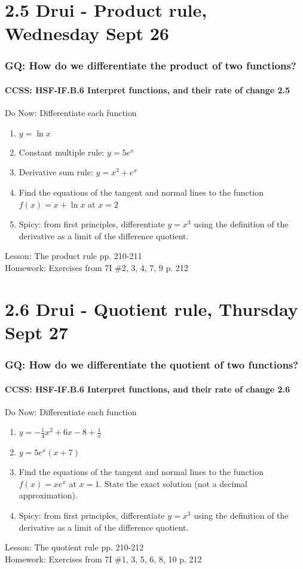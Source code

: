 \documentclass{beamer}
\begin{document}
\section{2.5 Drui - Product rule, Wednesday Sept 26}
  \frame
  {
    \frametitle{GQ: How do we differentiate the product of two functions?}
    \framesubtitle{CCSS: HSF-IF.B.6 Interpret functions, and their rate of change  \alert{2.5}}

    \begin{block}{Do Now: Differentiate each function}
      \begin{enumerate}
      \item $y= \ln x$
      \item Constant multiple rule: $y=5e^x$
      \item Derivative sum rule: $y=x^3+e^x$
      \item Find the equations of the tangent and normal lines to the function $f(x)=x+ \ln x$ at $x=2$
      \item Spicy: from first principles, differentiate $y=x^3$ using the definition of the derivative as a limit of the difference quotient.
      \end{enumerate}
   \end{block}
    Lesson: The product rule pp. 210-211\\ \bigskip
    Homework: Exercises from 7I \#2, 3, 4, 7, 9 p. 212
  }

\section{2.6 Drui - Quotient rule, Thursday Sept 27}
  \frame
  {
    \frametitle{GQ: How do we differentiate the quotient of two functions?}
    \framesubtitle{CCSS: HSF-IF.B.6 Interpret functions, and their rate of change  \alert{2.6}}

    \begin{block}{Do Now: Differentiate each function}
      \begin{enumerate}
      \item $y= -\frac{1}{4}x^2+6x-8+\frac{1}{x}$
      \item $y=5e^x(x+7)$
      \item Find the equations of the tangent and normal lines to the function $f(x)=x e^x$ at $x=1$. State the exact solution (not a decimal approximation).
      \item Spicy: from first principles, differentiate $y=x^3$ using the definition of the derivative as a limit of the difference quotient.
      \end{enumerate}
   \end{block}
    Lesson: The quotient rule pp. 210-212\\ \bigskip
    Homework: Exercises from 7I \#1, 3, 5, 6, 8, 10 p. 212
  }
\end{document}
